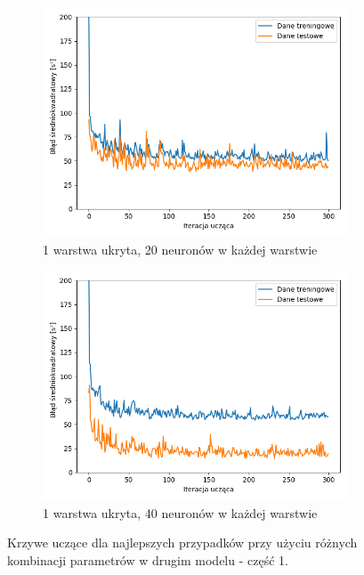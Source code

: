 \documentclass[12pt]{aghdpl}
\begin{document}
		\begin{figure}[h]
			\centering
			\begin{subfigure}{.8\linewidth}
		 		\includegraphics[width =\linewidth]{wykresy/3_drugi_model_tworzenie_i_analiza/wykres_uczenia.png}
		 		\caption{1 warstwa ukryta, 20 neuronów w każdej warstwie}
		 	\end{subfigure}
		 	\begin{subfigure}{.8\linewidth}
		 		\includegraphics[width =\linewidth]{wykresy/4_zwiekszenie_stopnia_skomplikowania_modelu/1_warstwa_40_neuronow_wykres_uczenia.png}
		 		\caption{1 warstwa ukryta, 40 neuronów w każdej warstwie}
		 	\end{subfigure}
		 	
		 	\caption{Krzywe uczące dla najlepszych przypadków przy użyciu różnych kombinacji parametrów w drugim modelu - część 1.}
		 	\label{fig: drugi_model_kombinacje_parametrow_wykresy_uczenia_1}
		\end{figure}
		
\end{document}
